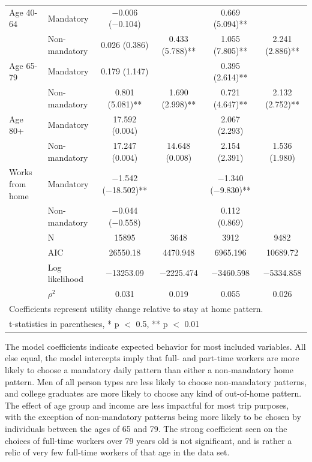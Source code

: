 \documentclass[3p, authoryear, review]{elsarticle} %
\begin{document}
\begin{table}
{\begin{tabular}[t]{llcccc}
Age 40-64 & Mandatory & \num{-0.006} (\num{-0.104}) &  & \num{0.669} (\num{5.094})** & \\
 & Non-mandatory & \num{0.026} (\num{0.386}) & \num{0.433} (\num{5.788})** & \num{1.055} (\num{7.805})** & \num{2.241} (\num{2.886})**\\
Age 65-79 & Mandatory & \num{0.179} (\num{1.147}) &  & \num{0.395} (\num{2.614})** & \\
 & Non-mandatory & \num{0.801} (\num{5.081})** & \num{1.690} (\num{2.998})** & \num{0.721} (\num{4.647})** & \num{2.132} (\num{2.752})**\\
Age 80+ & Mandatory & \num{17.592} (\num{0.004}) &  & \num{2.067} (\num{2.293}) & \\
 & Non-mandatory & \num{17.247} (\num{0.004}) & \num{14.648} (\num{0.008}) & \num{2.154} (\num{2.391}) & \num{1.536} (\num{1.980})\\
Works from home & Mandatory & \num{-1.542} (\num{-18.502})** &  & \num{-1.340} (\num{-9.830})** & \\
 & Non-mandatory & \num{-0.044} (\num{-0.558}) &  & \num{0.112} (\num{0.869}) & \\
\midrule
 & N & \num{15895} & \num{3648} & \num{3912} & \num{9482}\\
 & AIC & \num{26550.18} & \num{4470.948} & \num{6965.196} & \num{10689.72}\\
 & Log likelihood & \num{-13253.09} & \num{-2225.474} & \num{-3460.598} & \num{-5334.858}\\
 & $\rho^2$ & \num{0.031} & \num{0.019} & \num{0.055} & \num{0.026}\\
\bottomrule
\multicolumn{6}{l}{\rule{0pt}{1em}Coefficients represent utility change relative to stay at home pattern.}\\
\multicolumn{6}{l}{\rule{0pt}{1em}t-statistics in parentheses, * p $<$ 0.5, ** p $<$ 0.01}\\
\end{tabular}}
\end{table}

The model coefficients indicate expected behavior for most included variables.
All else equal, the model intercepts imply that full- and part-time workers
are more likely to choose a mandatory daily pattern than either a non-mandatory
home pattern. Men of all person types are less likely to choose non-mandatory
patterns, and college graduates are more likely to choose any kind of out-of-home
pattern. The effect of age group and income are less impactful for most trip
purposes, with the exception of non-mandatory patterns being more likely to be
chosen by individuals between the ages of 65 and 79. The strong coefficient
seen on the choices of full-time workers over 79 years old is not significant,
and is rather a relic of very few full-time workers of that age in the data set.
\end{document}
